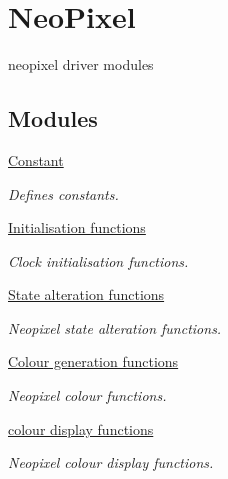 \hypertarget{group___neo_pixel}{}\section{Neo\+Pixel}
\label{group___neo_pixel}


neopixel driver modules  


\subsection*{Modules}
\begin{DoxyCompactItemize}
\item 
\hyperlink{group___constant}{Constant}
\begin{DoxyCompactList}\small\item\em Defines constants. \end{DoxyCompactList}\item 
\hyperlink{group___initialisation}{Initialisation functions}
\begin{DoxyCompactList}\small\item\em Clock initialisation functions. \end{DoxyCompactList}\item 
\hyperlink{group___state}{State alteration functions}
\begin{DoxyCompactList}\small\item\em Neopixel state alteration functions. \end{DoxyCompactList}\item 
\hyperlink{group___colour}{Colour generation functions}
\begin{DoxyCompactList}\small\item\em Neopixel colour functions. \end{DoxyCompactList}\item 
\hyperlink{group___display}{colour display functions}
\begin{DoxyCompactList}\small\item\em Neopixel colour display functions. \end{DoxyCompactList}\end{DoxyCompactItemize}
